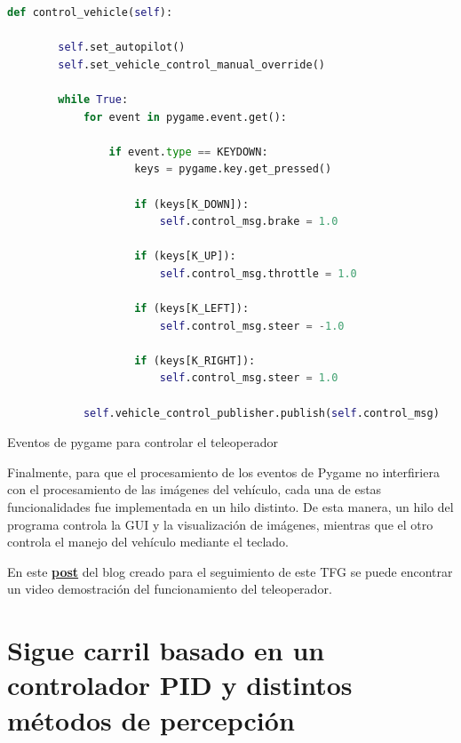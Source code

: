   \begin{code}[H]
	\begin{lstlisting}[language=Python]
    def control_vehicle(self):        
    
        self.set_autopilot()
        self.set_vehicle_control_manual_override()

        while True:
            for event in pygame.event.get():

                if event.type == KEYDOWN:
                    keys = pygame.key.get_pressed()

                    if (keys[K_DOWN]):
                        self.control_msg.brake = 1.0
		
                    if (keys[K_UP]):
                        self.control_msg.throttle = 1.0          

                    if (keys[K_LEFT]):
                        self.control_msg.steer = -1.0            

                    if (keys[K_RIGHT]):
                        self.control_msg.steer = 1.0
                        
            self.vehicle_control_publisher.publish(self.control_msg)

	\end{lstlisting}
\caption[Eventos de pygame para controlar el teleoperado]{Eventos de pygame para controlar el teleoperador}
\label{cod:Eventos de pygame para controlar el teleoperador}
\end{code}


\bigskip

Finalmente, para que el procesamiento de los eventos de Pygame no interfiriera con el procesamiento de las imágenes del vehículo, cada una de estas funcionalidades fue implementada en un hilo distinto. De esta manera, un hilo del programa controla la \ac{GUI} y la visualización de imágenes, mientras que el otro controla el manejo del vehículo mediante el teclado.

\bigskip

En este \href{https://roboticslaburjc.github.io/2022-tfg-juancamilo-carmona/DEMOS/}{\textbf{post}} del blog creado para el seguimiento de este \ac{TFG} se puede encontrar un video demostración del funcionamiento del teleoperador.

\bigskip


\section{ Sigue carril basado en un controlador PID y distintos métodos de percepción}
\label{ Sigue carriles basado en visión artificial y un controlador PID }

